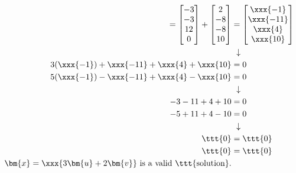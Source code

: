 \documentclass[basic]{inVerba-notes}
\begin{document}
\begin{enumerate}
\begin{enumerate}
{\begin{align*}
    =
    \begin{bmatrix} -3 \\ -3 \\ 12 \\ 0\end{bmatrix}
    +
    \begin{bmatrix} 2 \\ -8 \\ -8 \\ 10\end{bmatrix}
    &=
    \begin{bmatrix} \xxx{-1} \\ \xxx{-11} \\ \xxx{4}\\ \xxx{10}\end{bmatrix} \\
    &~\downarrow \\
    3(\xxx{-1}) + \xxx{-11}  + \xxx{4} + \xxx{10} &= 0 \\
    5(\xxx{-1}) - \xxx{-11}  + \xxx{4} - \xxx{10} &= 0 \\
    &~\downarrow \\
    -3 - 11 + 4 + 10 &= 0 \\
    -5 + 11 + 4 - 10 &= 0 \\
    &~\downarrow \\
    \ttt{0} &= \ttt{0} \\
    \ttt{0} &= \ttt{0} \\
    \bm{x}=\xxx{3\bm{u}+2\bm{v}}~\text{is a valid \ttt{solution}.}
  \end{align*}}
\end{enumerate}
\end{enumerate}
\end{document}
